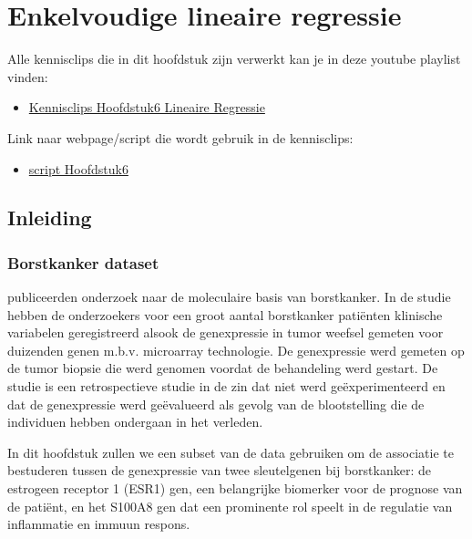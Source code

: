 \documentclass[
  dutch,
  letterpaper,
  12pt]{book}
\providecommand{\tightlist}{%
  \setlength{\itemsep}{0pt}\setlength{\parskip}{0pt}}
\theoremstyle{definition}
\theoremstyle{definition}
\theoremstyle{definition}
\theoremstyle{remark}
\begin{document}

\chapter{Enkelvoudige lineaire regressie}\label{sec-chap-linReg}

Alle kennisclips die in dit hoofdstuk zijn verwerkt kan je in deze
youtube playlist vinden:

\begin{itemize}
\tightlist
\item
  \href{https://www.youtube.com/playlist?list=PLZH1hP8_LbJJyNBiMlv24sSI0oKB8EtI0}{Kennisclips
  Hoofdstuk6 Lineaire Regressie}
\end{itemize}

Link naar webpage/script die wordt gebruik in de kennisclips:

\begin{itemize}
\tightlist
\item
  \href{https://statomics.github.io/sbc/rmd/06-linearRegression.html}{script
  Hoofdstuk6}
\end{itemize}

\section{Inleiding}\label{inleiding-5}

\subsection{Borstkanker dataset}\label{borstkanker-dataset}

\citet{sotiriou2006} publiceerden onderzoek naar de moleculaire basis
van borstkanker. In de studie hebben de onderzoekers voor een groot
aantal borstkanker patiënten klinische variabelen geregistreerd alsook
de genexpressie in tumor weefsel gemeten voor duizenden genen m.b.v.
microarray technologie. De genexpressie werd gemeten op de tumor biopsie
die werd genomen voordat de behandeling werd gestart. De studie is een
retrospectieve studie in de zin dat niet werd geëxperimenteerd en dat de
genexpressie werd geëvalueerd als gevolg van de blootstelling die de
individuen hebben ondergaan in het verleden.

In dit hoofdstuk zullen we een subset van de data gebruiken om de
associatie te bestuderen tussen de genexpressie van twee sleutelgenen
bij borstkanker: de estrogeen receptor 1 (ESR1) gen, een belangrijke
biomerker voor de prognose van de patiënt, en het S100A8 gen dat een
prominente rol speelt in de regulatie van inflammatie en immuun respons.
\end{document}
